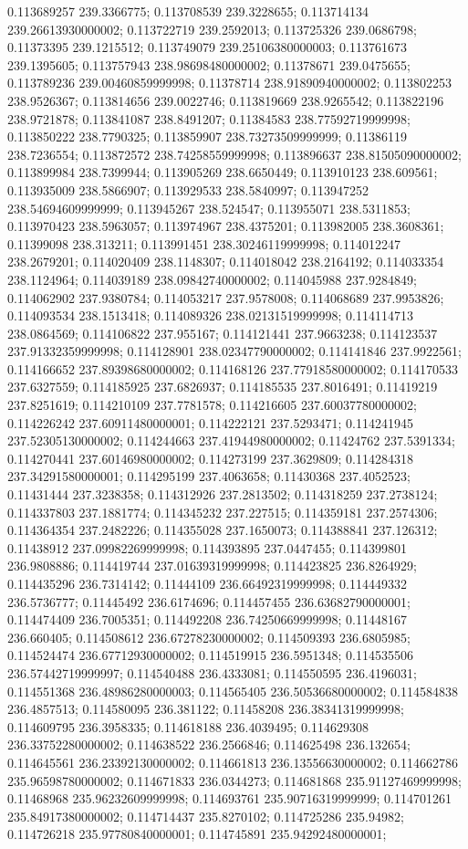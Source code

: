 0.113689257 239.3366775; 0.113708539 239.3228655; 0.113714134 239.26613930000002; 0.113722719 239.2592013; 0.113725326 239.0686798; 0.11373395 239.1215512; 0.113749079 239.25106380000003; 0.113761673 239.1395605; 0.113757943 238.98698480000002; 0.11378671 239.0475655; 0.113789236 239.00460859999998; 0.11378714 238.91890940000002; 0.113802253 238.9526367; 0.113814656 239.0022746; 0.113819669 238.9265542; 0.113822196 238.9721878; 0.113841087 238.8491207; 0.11384583 238.77592719999998; 0.113850222 238.7790325; 0.113859907 238.73273509999999; 0.11386119 238.7236554; 0.113872572 238.74258559999998; 0.113896637 238.81505090000002; 0.113899984 238.7399944; 0.113905269 238.6650449; 0.113910123 238.609561; 0.113935009 238.5866907; 0.113929533 238.5840997; 0.113947252 238.54694609999999; 0.113945267 238.524547; 0.113955071 238.5311853; 0.113970423 238.5963057; 0.113974967 238.4375201; 0.113982005 238.3608361; 0.11399098 238.313211; 0.113991451 238.30246119999998; 0.114012247 238.2679201; 0.114020409 238.1148307; 0.114018042 238.2164192; 0.114033354 238.1124964; 0.114039189 238.09842740000002; 0.114045988 237.9284849; 0.114062902 237.9380784; 0.114053217 237.9578008; 0.114068689 237.9953826; 0.114093534 238.1513418; 0.114089326 238.02131519999998; 0.114114713 238.0864569; 0.114106822 237.955167; 0.114121441 237.9663238; 0.114123537 237.91332359999998; 0.114128901 238.02347790000002; 0.114141846 237.9922561; 0.114166652 237.89398680000002; 0.114168126 237.77918580000002; 0.114170533 237.6327559; 0.114185925 237.6826937; 0.114185535 237.8016491; 0.11419219 237.8251619; 0.114210109 237.7781578; 0.114216605 237.60037780000002; 0.114226242 237.60911480000001; 0.114222121 237.5293471; 0.114241945 237.52305130000002; 0.114244663 237.41944980000002; 0.11424762 237.5391334; 0.114270441 237.60146980000002; 0.114273199 237.3629809; 0.114284318 237.34291580000001; 0.114295199 237.4063658; 0.11430368 237.4052523; 0.11431444 237.3238358; 0.114312926 237.2813502; 0.114318259 237.2738124; 0.114337803 237.1881774; 0.114345232 237.227515; 0.114359181 237.2574306; 0.114364354 237.2482226; 0.114355028 237.1650073; 0.114388841 237.126312; 0.11438912 237.09982269999998; 0.114393895 237.0447455; 0.114399801 236.9808886; 0.114419744 237.01639319999998; 0.114423825 236.8264929; 0.114435296 236.7314142; 0.11444109 236.66492319999998; 0.114449332 236.5736777; 0.11445492 236.6174696; 0.114457455 236.63682790000001; 0.114474409 236.7005351; 0.114492208 236.74250669999998; 0.11448167 236.660405; 0.114508612 236.67278230000002; 0.114509393 236.6805985; 0.114524474 236.67712930000002; 0.114519915 236.5951348; 0.114535506 236.57442719999997; 0.114540488 236.4333081; 0.114550595 236.4196031; 0.114551368 236.48986280000003; 0.114565405 236.50536680000002; 0.114584838 236.4857513; 0.114580095 236.381122; 0.11458208 236.38341319999998; 0.114609795 236.3958335; 0.114618188 236.4039495; 0.114629308 236.33752280000002; 0.114638522 236.2566846; 0.114625498 236.132654; 0.114645561 236.23392130000002; 0.114661813 236.13556630000002; 0.114662786 235.96598780000002; 0.114671833 236.0344273; 0.114681868 235.91127469999998; 0.11468968 235.96232609999998; 0.114693761 235.90716319999999; 0.114701261 235.84917380000002; 0.114714437 235.8270102; 0.114725286 235.94982; 0.114726218 235.97780840000001; 0.114745891 235.94292480000001; 